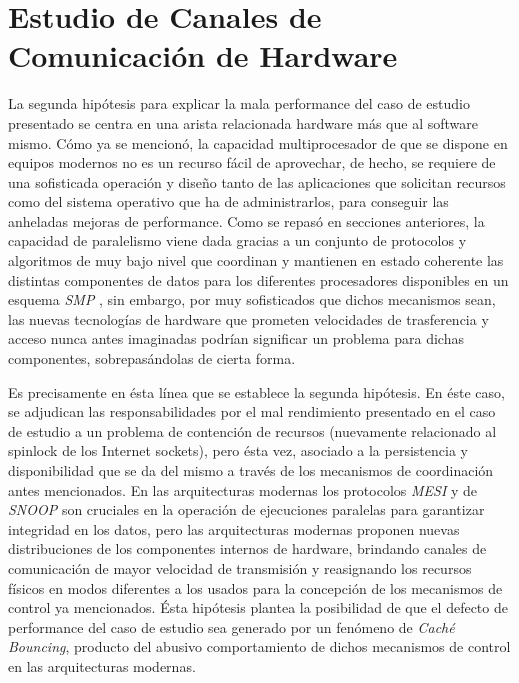 \section{Estudio de Canales de Comunicación de Hardware}
La segunda hipótesis para explicar la mala performance del caso de estudio presentado se centra en una arista relacionada hardware más que al software mismo. Cómo ya se mencionó, la capacidad multiprocesador de que se dispone en equipos modernos no es un recurso fácil de aprovechar, de hecho, se requiere de una sofisticada operación y diseño tanto de las aplicaciones que solicitan recursos como del sistema operativo que ha de administrarlos, para conseguir las anheladas mejoras de performance. Como se repasó en secciones anteriores, la capacidad de paralelismo viene dada gracias a un conjunto de protocolos y algoritmos de muy bajo nivel que coordinan y mantienen en estado coherente las distintas componentes de datos para los diferentes procesadores disponibles en un esquema \emph{SMP} \cite{paper:MESI, paper:snoop}, sin embargo, por muy sofisticados que dichos mecanismos sean, las nuevas tecnologías de hardware que prometen velocidades de trasferencia y acceso nunca antes imaginadas podrían significar un problema para dichas componentes, sobrepasándolas de cierta forma.

Es precisamente en ésta línea que se establece la segunda hipótesis. En éste caso, se adjudican las responsabilidades por el mal rendimiento presentado en el caso de estudio a un problema de contención de recursos (nuevamente relacionado al spinlock de los Internet sockets), pero ésta vez, asociado a la persistencia y disponibilidad que se da del mismo a través de los mecanismos de coordinación antes mencionados. En las arquitecturas modernas los protocolos \emph{MESI} y de \emph{SNOOP} son cruciales en la operación de ejecuciones paralelas para garantizar integridad en los datos, pero las arquitecturas modernas proponen nuevas distribuciones de los componentes internos de hardware, brindando canales de comunicación de mayor velocidad de transmisión y reasignando los recursos físicos en modos diferentes a los usados para la concepción de los mecanismos de control ya mencionados. Ésta hipótesis plantea la posibilidad de que el defecto de performance del caso de estudio sea generado por un fenómeno de \emph{Caché Bouncing}, producto del abusivo comportamiento de dichos mecanismos de control en las arquitecturas modernas.

